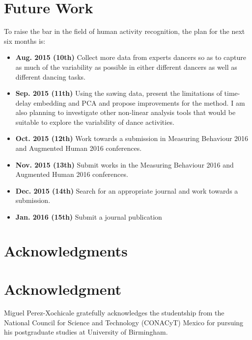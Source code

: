 \documentclass[10pt,journal,compsoc]{IEEEtran}
\begin{document}
\section{Future Work} 
To raise the bar in the field of human activity recognition,
the plan for the next six months is:
\begin{itemize}
\item \textbf{Aug. 2015 (10th)} Collect more data from experts 
  dancers so as to capture as much of the variability 
  as possible in either different dancers as well as 
  different dancing tasks.
\item \textbf{Sep. 2015 (11th)} Using the sawing data, present 
  the limitations of time-delay embedding and PCA 
  and propose improvements for the method. I am 
  also planning to investigate other non-linear analysis 
  tools that would be suitable to explore the variability 
  of dance activities.
\item \textbf{Oct. 2015 (12th)} Work towards a submission in 
  Measuring Behaviour 2016 and Augmented Human 
  2016 conferences.
\item \textbf{Nov. 2015 (13th)} Submit works in the Measuring 
  Behaviour 2016 and Augmented Human 2016 
  conferences.
\item \textbf{Dec. 2015 (14th)} Search for an appropriate journal 
  and work towards a submission.
\item \textbf{Jan. 2016 (15th)} Submit a journal publication
\end{itemize}


\ifCLASSOPTIONcompsoc
  \section*{Acknowledgments}
\else
  \section*{Acknowledgment}
\fi

Miguel Perez-Xochicale gratefully acknowledges the studentship from 
the National Council for Science and Technology (CONACyT) Mexico
for pursuing his postgraduate studies at University of Birmingham.

\ifCLASSOPTIONcaptionsoff
  \newpage
\fi
\end{document}
